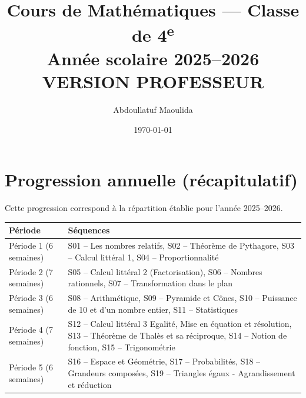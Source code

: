 \documentclass[12pt,a4paper]{book}
\title{Cours de Mathématiques — Classe de 4\textsuperscript{e}\\[0.4em]\large Année scolaire 2025–2026\\[0.2em]\textcolor{mainBlue}{\normalsize VERSION PROFESSEUR}}
\author{Abdoullatuf Maoulida}
\date{\today}
\begin{document}
\VersionCorrige
\maketitle
\tableofcontents
\cleardoublepage



\cleardoublepage
\appendix
\chapter{Progression annuelle (récapitulatif)}
Cette progression correspond à la répartition établie pour l'année 2025–2026.

\begin{center}
	\begin{tabular}{|p{2cm}|p{12cm}|}
		\hline
		\textbf{Période} & \textbf{Séquences} \\ \hline
		Période 1 (6 semaines) & S01 -- Les nombres relatifs, S02 -- Théorème de Pythagore, S03 -- Calcul littéral 1, S04 -- Proportionnalité \\ \hline
		Période 2 (7 semaines) & S05 -- Calcul littéral 2 (Factorisation), S06 -- Nombres rationnels, S07 -- Transformation dans le plan \\ \hline
		Période 3 (6 semaines) & S08 -- Arithmétique, S09 -- Pyramide et Cônes, S10 -- Puissance de 10 et d'un nombre entier, S11 -- Statistiques \\ \hline
		Période 4 (7 semaines) & S12 -- Calcul littéral 3 Egalité, Mise en équation et résolution, S13 -- Théorème de Thalès et sa réciproque, S14 -- Notion de fonction, S15 -- Trigonométrie \\ \hline
		Période 5 (6 semaines) & S16 -- Espace et Géométrie, S17 -- Probabilités, S18 -- Grandeurs composées, S19 -- Triangles égaux - Agrandissement et réduction \\ \hline
	\end{tabular}
\end{center}
\end{document}
